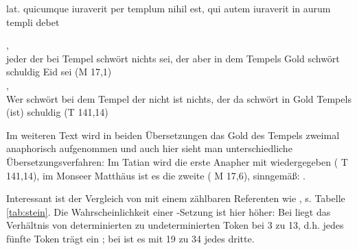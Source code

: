 \begin{exe}
\ex
lat. quicumque iuraverit per templum nihil est, qui autem iuraverit in aurum templi debet 
\sn {}
\begin{xlist}
\ex \label{ex:gold-M} \gll  {}     ,               \\
{jeder der} {bei} {Tempel} {schwört} {nichts} {sei}, 
{der} {aber} {in} {dem} {Tempels} {Gold} {schwört} {schuldig} {Eid} {sei} (M 17,1)\\

\ex \label{ex:gold-T} \gll 
{}       ,         \\
{Wer} {schwört} {bei} {dem} {Tempel} {der} {nicht ist} {nichts},
{der} {da} {schwört} {in} {Gold} {Tempels} {(ist) schuldig} (T 141,14)\\
\end{xlist}
\end{exe}

Im weiteren Text wird in beiden Übersetzungen das Gold des Tempels zweimal anaphorisch aufgenommen und auch hier sieht man unterschiedliche Übersetzungsverfahren: Im Tatian wird die erste Anapher mit  wiedergegeben ( T 141,14),
im Monseer Matthäus ist es die zweite ( M 17,6), sinngemäß: . 
%
%

Interessant ist der Vergleich von  mit einem zählbaren Referenten wie  , s. Tabelle \ref{tab:stein}. Die Wahrscheinlichkeit einer -Setzung ist hier höher: Bei  liegt das Verhältnis von determinierten zu undeterminierten Token bei 3 zu 13, d.h. jedes fünfte Token trägt ein ; bei  ist es mit 19 zu 34 jedes dritte. 

